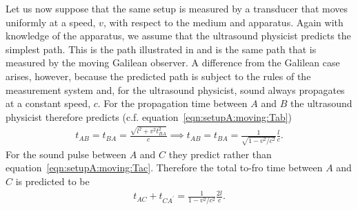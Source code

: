 Let us now suppose that the  same setup is measured by a transducer that moves uniformly at a speed, $v$, with respect to the medium and apparatus.
Again with knowledge of the apparatus, we assume that the ultrasound physicist  predicts the simplest path.
This is the path illustrated in  and is the same path that is measured by the  moving Galilean observer.
%
%
A difference from the Galilean case arises,
however,
because the predicted path is subject to the rules of the measurement system
and, for the ultrasound physicist,  sound always propagates at a  constant speed, $c$.
For the propagation time between $A$ and $B$ the ultrasound physicist therefore predicts (c.f. equation~\ref{eqn:setupA:moving:Tab})
\begin{align}
  \label{eqn:setupA:moving:Tab:acoustic}
  t_{AB} = t_{BA} =  \frac{\sqrt{l^2+v^2t_{BA}^2}}{c} \implies t_{AB} =  t_{BA} =\frac{1}{\sqrt{1-v^2/c^2}} \frac{l}{c}.
\end{align}
For the sound pulse between $A$ and $C$  they  predict
rather than  equation~\ref{eqn:setupA:moving:Tac}.
Therefore the total to-fro time between $A$ and $C$  is   predicted   to be
\begin{align}
\label{eqn:setupA:moving:Tac:acoustic}
t_{AC}+t_{CA^\prime} = \frac{1}{{1-v^2/c^2}} \frac{2l}{c}.
\end{align}

